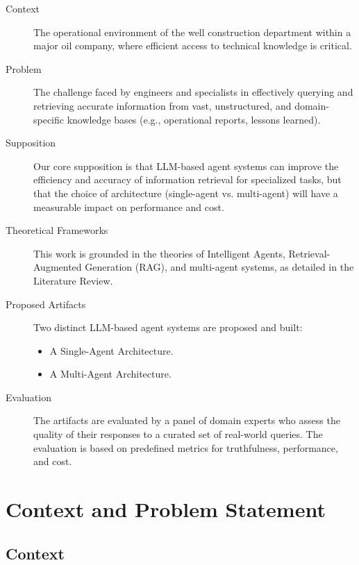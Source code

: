         \begin{description}
            \item[Context] The operational environment of the well construction department within a major oil company, where efficient access to technical knowledge is critical.

            \item[Problem] The challenge faced by engineers and specialists in effectively querying and retrieving accurate information from vast, unstructured, and domain-specific knowledge bases (e.g., operational reports, lessons learned).

            \item[Supposition] Our core supposition is that LLM-based agent systems can improve the efficiency and accuracy of information retrieval for specialized tasks, but that the choice of architecture (single-agent vs. multi-agent) will have a measurable impact on performance and cost.

            \item[Theoretical Frameworks] This work is grounded in the theories of Intelligent Agents, Retrieval-Augmented Generation (RAG), and multi-agent systems, as detailed in the Literature Review.

            \item[Proposed Artifacts] Two distinct LLM-based agent systems are proposed and built:
            \begin{itemize}
                \item A Single-Agent Architecture.
                \item A Multi-Agent Architecture.
            \end{itemize}

            \item[Evaluation] The artifacts are evaluated by a panel of domain experts who assess the quality of their responses to a curated set of real-world queries. The evaluation is based on predefined metrics for truthfulness, performance, and cost.
        \end{description}

    \section{Context and Problem Statement}

        \subsection{Context}

